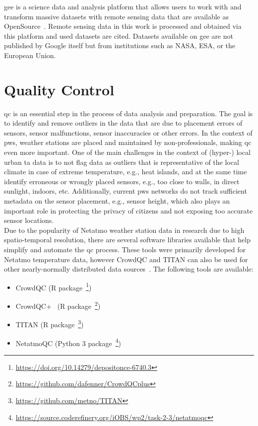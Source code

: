 \gls{gee} is a science data and analysis platform that allows users to work with and transform massive datasets with remote sensing data that are available as OpenSource~\cite{gorelick2017google}. Remote sensing data in this work is processed and obtained via this platform and used datasets are cited. Datasets available on \gls{gee} are not published by Google itself but from institutions such as NASA, ESA, or the European Union.

\section{Quality Control}
\label{sec:quality control}

\gls{qc} is an essential step in the process of data analysis and preparation. The goal is to identify and remove outliers in the data that are due to placement errors of sensors, sensor malfunctions, sensor inaccuracies or other errors. In the context of \gls{pws}, weather stations are placed and maintained by non-professionals, making \gls{qc} even more important. One of the main challenges in the context of (hyper-) local urban \gls{ta} data is to not flag data as outliers that is representative of the local climate in case of extreme temperature, e.g., heat islands, and at the same time identify erroneous or wrongly placed sensors, e.g., too close to walls, in direct sunlight, indoors, etc. Additionally, current \gls{pws} networks do not track sufficient metadata on the sensor placement, e.g., sensor height, which also plays an important role in protecting the privacy of citizens and not exposing too accurate sensor locations.\\
Due to the popularity of Netatmo weather station data in research due to high spatio-temporal resolution, there are several software libraries available that help simplify and automate the \gls{qc} process. These tools were primarily developed for Netatmo temperature data, however CrowdQC and TITAN can also be used for other nearly-normally distributed data sources~\cite{hahn2022observations}. The following tools are available:

\begin{itemize}
    \item CrowdQC (R package~\footnote{\url{https://doi.org/10.14279/depositonce-6740.3}})
    \item CrowdQC+~\cite{fenner2021crowdqc+} (R package~\footnote{\url{https://github.com/dafenner/CrowdQCplus}})
    \item TITAN (R package~\footnote{\url{https://github.com/metno/TITAN}})
    \item NetatmoQC (Python 3 package~\footnote{\url{https://source.coderefinery.org/iOBS/wp2/task-2-3/netatmoqc}})
\end{itemize}

